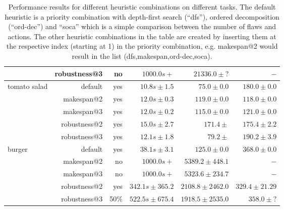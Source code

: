 \begin{table}[]
\begin{tabular}{p{1.5cm}rrrrr}
                                & robustness@3                  & no      & $1000.0s+$                  & $21336.0\pm?$                        & $-     $                     \\\hline
  \multirow{5}{*}{\parbox{1.5cm}{tomato salad}} 
                                & default                       & yes     & $10.8s\pm1.5 $              & $75.0\pm0.0$                         & $180.0 \pm0.0$               \\
                                & makespan@2                    & yes     & $12.0s\pm0.3 $              & $119.0\pm0.0$                        & $118.0 \pm0.0$               \\
                                & makespan@3                    & yes     & $12.0s\pm0.2 $              & $115.0\pm0.0$                        & $121.0 \pm0.0$               \\
                                & robustness@2                  & yes     & $15.0s\pm2.7 $              & $171.4\pm$                           & $175.4 \pm2.2$               \\
                                & robustness@3                  & yes     & $12.1s\pm1.8 $              & $79.2\pm$                            & $190.2 \pm3.9$               \\\hline
  \multirow{5}{*}{burger}       & default                       & yes     & $38.1s\pm 3.1$              & $125.0\pm0.0$                        & $368.0\pm0.0$                \\
                                & makespan@2                    & no      & $1000.0s+$                  & $5389.2\pm448.1$                     & $-     $                     \\
                                & makespan@3                    & no      & $1000.0s+ $                 & $5323.6\pm234.7$                     & $-     $                     \\
                                & robustness@2                  & yes     & $342.1s\pm365.2 $           & $2108.8\pm2462.0$                    & $329.4 \pm21.29$             \\ 
                                & robustness@3                  & 50\%    & $522.5s\pm675.4 $           & $1918.5\pm2535.0$                    & $358.0 \pm?$                                      
  \end{tabular}
  \caption[Performance results for different heuristic combinations]{Performance results for different heuristic combinations on different tasks. The default heuristic is a priority combination with depth-first search (``dfs''), ordered decomposition (``ord-dec'') and ``soca'' which is a simple comparison between the number of flaws and actions. The other heuristic combinations in the table are created by inserting them at the respective index (starting at 1) in the priority combination, e.g. makespan@2 would result in the list (dfs,makespan,ord-dec,soca).}
  \label{tab:eval-heuristics}
\end{table}

